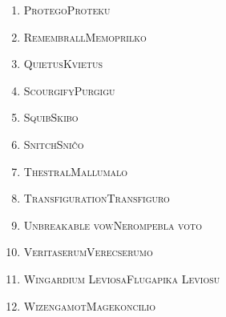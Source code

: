 \begin{enumerate}
\smallskip
\item\label{nomoj:proteku} \textsc{Protego}\dotfill \textsc{Proteku}\\
\smallskip
\item\label{nomoj:memopriklo} \textsc{Remembrall}\dotfill \textsc{Memoprilko}\\
\smallskip
\item\label{nomoj:kvietus} \textsc{Quietus}\dotfill \textsc{Kvietus}\\
\smallskip
\item\label{nomoj:purgigu} \textsc{Scourgify}\dotfill \textsc{Purgigu}\\
\smallskip
\item\label{nomoj:skibo} \textsc{Squib}\dotfill \textsc{Skibo}\\
\smallskip
\item\label{nomoj:sniĉo} \textsc{Snitch}\dotfill \textsc{Sniĉo}\\
\smallskip
\item\label{nomoj:mallumalo} \textsc{Thestral}\dotfill \textsc{Mallumalo}\\
\smallskip
\item\label{nomoj:transfiguro} \textsc{Transfiguration}\dotfill \textsc{Transfiguro}\\
\smallskip
\item\label{nomoj:nerompebla} \textsc{Unbreakable vow}\dotfill \textsc{Nerompebla voto}\\
\smallskip
\item\label{nomoj:serumo} \textsc{Veritaserum}\dotfill \textsc{Verecserumo}\\
\smallskip
\item\label{nomoj:leviosu} \textsc{Wingardium Leviosa}\dotfill \textsc{Flugapika Leviosu}\\
\smallskip
\item\label{nomoj:magenkoncilio} \textsc{Wizengamot}\dotfill \textsc{Magekoncilio}\\
\smallskip
\end{enumerate}
